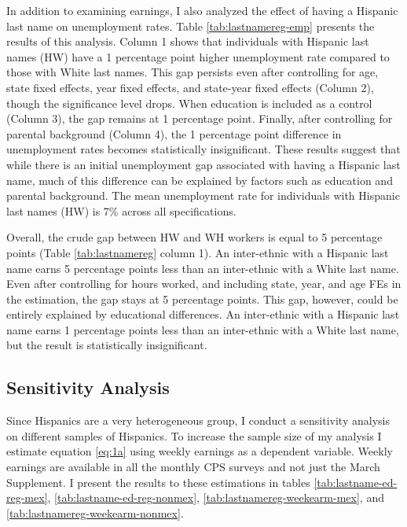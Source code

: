 In addition to examining earnings, I also analyzed the effect of having a Hispanic last name on unemployment rates. Table \ref{tab:lastnamereg-emp} presents the results of this analysis. Column 1 shows that individuals with Hispanic last names (HW) have a 1 percentage point higher unemployment rate compared to those with White last names. This gap persists even after controlling for age, state fixed effects, year fixed effects, and state-year fixed effects (Column 2), though the significance level drops. When education is included as a control (Column 3), the gap remains at 1 percentage point. Finally, after controlling for parental background (Column 4), the 1 percentage point difference in unemployment rates becomes statistically insignificant. These results suggest that while there is an initial unemployment gap associated with having a Hispanic last name, much of this difference can be explained by factors such as education and parental background. The mean unemployment rate for individuals with Hispanic last names (HW) is 7\% across all specifications.

Overall, the crude gap between HW and WH workers is equal to 5 percentage points (Table \ref{tab:lastnamereg} column 1). An inter-ethnic with a Hispanic last name earns 5 percentage points less than an inter-ethnic with a White last name. Even after controlling for hours worked, and including state, year, and age FEs in the estimation, the gap stays at 5 percentage points. This gap, however, could be entirely explained by educational differences. An inter-ethnic with a Hispanic last name earns 1 percentage points less than an inter-ethnic with a White last name, but the result is statistically insignificant. 

\subsection{Sensitivity Analysis}

Since Hispanics are a very heterogeneous group, I conduct a sensitivity analysis on different samples of Hispanics. To increase the sample size of my analysis I estimate equation \ref{eq:1a} using weekly earnings as a dependent variable. Weekly earnings are available in all the monthly CPS surveys and not just the March Supplement. I present the results to these estimations in tables \ref{tab:lastname-ed-reg-mex}, \ref{tab:lastname-ed-reg-nonmex}, \ref{tab:lastnamereg-weekearm-mex}, and \ref{tab:lastnamereg-weekearm-nonmex}. 

